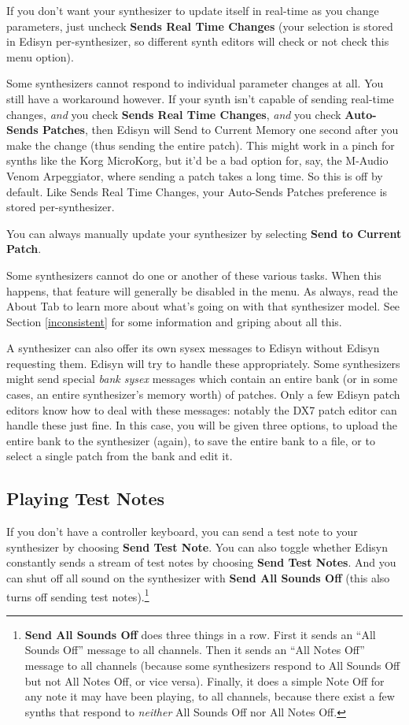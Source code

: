 \documentclass{article}
\begin{document}
If you don't want your synthesizer to update itself in real-time as you change parameters, just uncheck {\bf Sends Real Time Changes} (your selection is stored in Edisyn per-synthesizer, so different synth editors will check or not check this menu option).

Some synthesizers cannot respond to individual parameter changes at all.  You still have a workaround however.  If your synth isn't capable of sending real-time changes, {\it and} you check  {\bf Sends Real Time Changes}, {\it and} you check  {\bf Auto-Sends Patches}, then Edisyn will Send to Current Memory one second after you make the change (thus sending the entire patch).  This might work in a pinch for synths like the Korg MicroKorg, but it'd be a bad option for, say, the M-Audio Venom Arpeggiator, where sending a patch takes a long time.  So this is off by default.  Like Sends Real Time Changes, your Auto-Sends Patches preference is stored per-synthesizer.

 You can always manually update your synthesizer by selecting {\bf Send to Current Patch}.

\vspace{1em}

Some synthesizers cannot do one or another of these various tasks.   When this happens, that feature will generally be disabled in the menu.  As always, read the About Tab to learn more about what's going on with that synthesizer model.  See Section \ref{inconsistent} for some information and griping about all this.

A synthesizer can also offer its own sysex messages to Edisyn without Edisyn requesting them.  Edisyn will try to handle these appropriately.  Some synthesizers might send special {\it bank sysex} messages which contain an entire bank (or in some cases, an entire synthesizer's memory worth) of patches.  Only a few Edisyn patch editors know how to deal with these messages: notably the DX7 patch editor can handle these just fine.  In this case, you will be given three options, to upload the entire bank to the synthesizer (again), to save the entire bank to a file, or to select a single patch from the bank and edit it.

\subsection{Playing Test Notes}
\label{playingtestnotes}

If you don't have a controller keyboard, you can send a test note to your synthesizer by choosing {\bf Send Test Note}.  You can also toggle whether Edisyn constantly sends a stream of test notes by choosing {\bf Send Test Notes}.  And you can shut off all sound on the synthesizer with {\bf Send All Sounds Off} (this also turns off sending test notes).\footnote{{\bf Send All Sounds Off} does three things in a row.  First it sends an ``All Sounds Off'' message to all channels.  Then it sends an ``All Notes Off'' message  to all channels (because some synthesizers respond to All Sounds Off but not All Notes Off, or vice versa).  Finally, it does a simple Note Off for any note it may have been playing, to all channels, because there exist a few synths that respond to {\it neither} All Sounds Off nor All Notes Off.}
\end{document}

